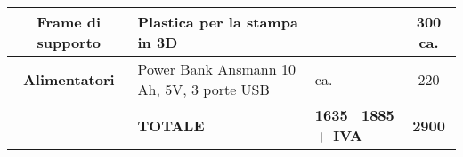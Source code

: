 \begin{table*}
\begin{tabular}{c  L{0.3\textwidth}  L{0.2\textwidth}  c }
\textbf{Frame di supporto} & Plastica per la stampa in 3D &  & 300 ca. \\ \midrule
\textbf{Alimentatori} & Power Bank Ansmann 10 Ah, 5V, 3 porte USB &  ca. & 220 \\ \midrule

&\textbf{TOTALE} & \textbf{1635 \ 1885 + IVA} & \textbf{2900} \\ \bottomrule 
                                            
                                                


\end{tabular}
\end{table*}


